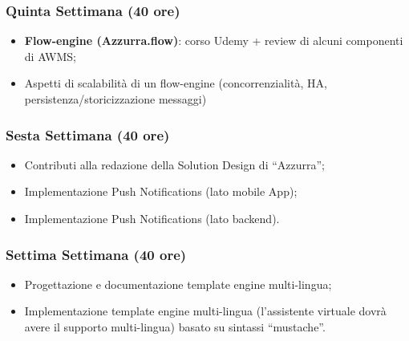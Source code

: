 {    \subsubsection{Quinta Settimana (40 ore)}
    	 \begin{itemize}
    			\item \textbf{Flow-engine (Azzurra.flow)}: corso Udemy + review di alcuni componenti di AWMS;
    			\item Aspetti di scalabilità di un flow-engine (concorrenzialità, HA, persistenza/storicizzazione
    			messaggi)
    	\end{itemize}
    	
    \subsubsection{Sesta Settimana (40 ore)}
     	 \begin{itemize}
     		\item Contributi alla redazione della Solution Design di “Azzurra”;
     		\item Implementazione Push Notifications (lato mobile App);
     		\item Implementazione Push Notifications (lato backend).
     	\end{itemize}
    
    \subsubsection{Settima Settimana (40 ore)}
    	 \begin{itemize}
    		\item Progettazione e documentazione template engine multi-lingua;
    		\item Implementazione template engine multi-lingua (l’assistente virtuale dovrà avere il supporto multi-lingua) basato su sintassi “mustache”.
    	\end{itemize}	
    
}
